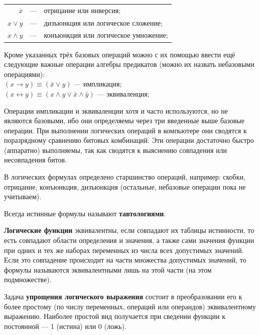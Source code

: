 \noindent
{
    \setlength{\tabcolsep}{2pt}
    \begin{tabular}{@{} r c l @{}}
        $ \overline{x} $ & --- & отрицание или инверсия; \\
        $ x \vee y $     & --- & дизъюнкция или логическое сложение; \\
        $ x \wedge y $   & --- & конъюнкция или логическое умножение; \\
    \end{tabular}
}

\bigskip
Кроме указанных трёх базовых операций можно с их помощью ввести ещё следующие важные операции алгебры предикатов (можно их назвать небазовыми операциями): \\
$(x\to y) \equiv (\bar{x} \vee y)$ --- импликация; \\
$(x\leftrightarrow y) \equiv (x \wedge y \vee \bar{x} \wedge \bar{y})$ --- эквиваленция;

Операции импликации и эквиваленции хотя и часто используются, но не являются базовыми, ибо они определяемы через три введенные выше базовые операции.
При выполнении логических операций в компьютере они сводятся к поразрядному сравнению битовых комбинаций.
Эти операции достаточно быстро (аппаратно) выполняемы, так как сводятся к выяснению совпадения или несовпадения битов.

В логических формулах определено старшинство операций, например: скобки, отрицание, конъюнкция, дизъюнкция (остальные, небазовые операции пока не учитываем).

\noindent
Всегда истинные формулы называют \textbf{тавтологиями}.

\textbf{Логические функции} эквивалентны, если совпадают их таблицы истинности, то есть совпадают области определения и значения, а также сами значения функции при одних и тех же наборах переменных из числа всех допустимых значений. Если это совпадение происходит на части множества допустимых значений, то формулы называются эквивалентными лишь на этой части (на этом подмножестве).

Задача \textbf{упрощения логического выражения} состоит в преобразовании его к более простому (по числу переменных, операций или операндов) эквивалентному выражению. Наиболее простой вид получается при сведении функции к постоянной --- 1 (истина) или 0 (ложь).
